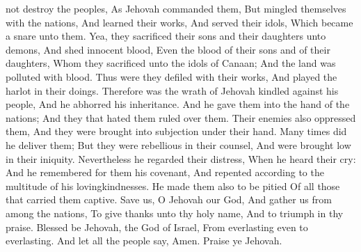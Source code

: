 not destroy the peoples, As Jehovah commanded them,  But mingled themselves with the nations, And learned their works,  And served their idols, Which became a snare unto them.  Yea, they sacrificed their sons and their daughters unto demons,  And shed innocent blood, Even the blood of their sons and of their daughters, Whom they sacrificed unto the idols of Canaan; And the land was polluted with blood.  Thus were they defiled with their works, And played the harlot in their doings.  Therefore was the wrath of Jehovah kindled against his people, And he abhorred his inheritance.  And he gave them into the hand of the nations; And they that hated them ruled over them.  Their enemies also oppressed them, And they were brought into subjection under their hand.  Many times did he deliver them; But they were rebellious in their counsel, And were brought low in their iniquity.  Nevertheless he regarded their distress, When he heard their cry:  And he remembered for them his covenant, And repented according to the multitude of his lovingkindnesses.  He made them also to be pitied Of all those that carried them captive.  Save us, O Jehovah our God, And gather us from among the nations, To give thanks unto thy holy name, And to triumph in thy praise.  Blessed be Jehovah, the God of Israel, From everlasting even to everlasting. And let all the people say, Amen. Praise ye Jehovah. 

